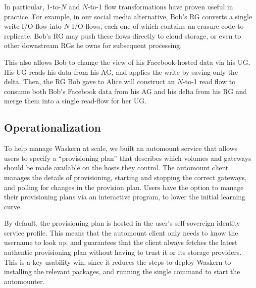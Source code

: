 In particular, 1-to-$N$ and $N$-to-1 flow transformations have proven useful in
practice.  For example, in our social media alternative, Bob's RG
converts a single write I/O flow into $N$ I/O flows, each one of which
contains an erasure code to replicate.  Bob's RG may push these flows directly
to cloud storage, or even to other downstream RGs he owns for subsequent processing.

This also allows Bob to change the view of his Facebook-hosted data via his UG.
His UG reads his data from his AG, and applies the write by saving only the delta.
Then, the RG Bob gave to Alice will construct an
$N$-to-1 read flow to consume both Bob's Facebook data from his AG and his delta
from his RG and merge them into a single read-flow for her UG.

\subsection{Operationalization}

To help manage Waskern at scale, we built an automount service that allows
users to specify a ``provisioning plan'' that describes which volumes and
gateways should be made available on the hosts they control. The automount client manages the
details of provisioning, starting and stopping the correct gateways, and polling
for changes in the provision plan.  Users have the option to manage their provisioning plans
via an interactive program, to lower the initial learning curve.

By default, the provisioning plan is hosted in the user's self-sovereign
identity service profile.  This means that the automount client only needs to know
the username to look up, and guarantees that the client always
fetches the latest authentic provisioning plan without having to trust it or its
storage providers.  This is a key usability win, since it reduces the steps to
deploy Waskern to installing the relevant packages, and running the single
command to start the automounter.
